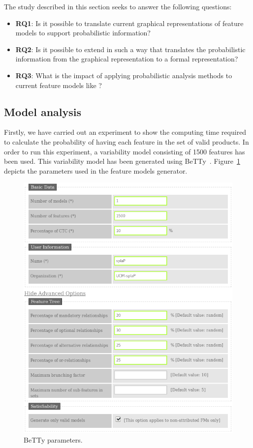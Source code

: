 The study described in this section seeks to answer the following questions:

\begin{itemize}
        \item \textbf{RQ1}: Is it possible to translate current graphical representations of feature models to
        support probabilistic information?
        \item \textbf{RQ2}: Is it possible to extend \fodaPA in such a way that
        translates the probabilistic information from the graphical representation to a formal representation?
        \item \textbf{RQ3}: What is the impact of applying probabilistic analysis methods to current feature models like \FODA?
\end{itemize}




\subsection{Model analysis}
\label{sec:stat:impl:model:analysis}

Firstly, we have carried out an experiment to
show the computing time required to calculate the probability of having
each feature in the set of valid products.
In order to run this experiment, a variability model consisting of
1500 features has been used.
This variability model
has been generated using BeTTy~\cite{SeguraHBC11}.
Figure~\ref{fig:plot:betty:params} depicts the parameters used in the feature models
generator.

\begin{figure}[h]
        \centering
        \linefigure
        \includegraphics[width=0.8\hsize,angle=0]{BeTTy_website.png}
        \linefigure
        \caption{BeTTy parameters.}\label{fig:plot:betty:params}
\end{figure}


